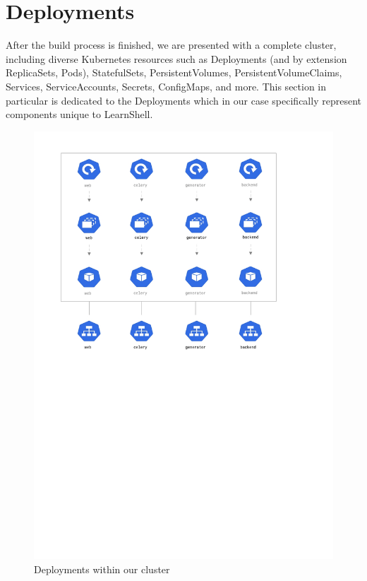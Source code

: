\documentclass[thesis=B,english]{FITthesis}[2019/12/23]
\begin{document}
\section{Deployments}

After the build process is finished, we are presented with a complete cluster, including diverse Kubernetes resources such as Deployments (and by extension ReplicaSets, Pods), StatefulSets, PersistentVolumes, PersistentVolumeClaims, Services, ServiceAccounts, Secrets, ConfigMaps, and more. This section in particular is dedicated to the Deployments which in our case specifically represent components unique to LearnShell.

\begin{figure}[H]
\centering
\caption{Deployments within our cluster}
\hspace*{-2cm}
\includegraphics[scale=0.5]{deployment-diagram}
\end{figure}
\end{document}

